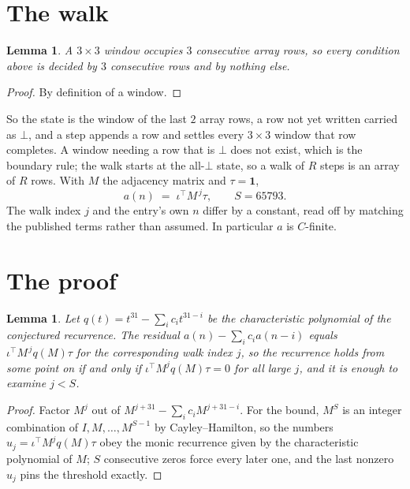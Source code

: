\documentclass[11pt,a4paper]{article}
\theoremstyle{plain}
\newtheorem{lemma}[theorem]{Lemma}
\theoremstyle{definition}
\begin{document}
\section{The walk}

\begin{lemma}\label{lem:win}
A $3\times3$ window occupies $3$ consecutive array rows, so every condition above is
decided by $3$ consecutive rows and by nothing else.
\end{lemma}

\begin{proof}
By definition of a window.
\end{proof}

So the state is the window of the last $2$ array rows, a row not yet written carried as
$\bot$, and a step appends a row and settles every $3\times3$ window that row completes. A
window needing a row that is $\bot$ does not exist, which is the boundary rule; the walk starts
at the all-$\bot$ state, so a walk of $R$ steps is an array of $R$ rows. With $M$ the adjacency
matrix and $\tau=\mathbf{1}$,
\[
a(n)\;=\;\iota^{\!\top}M^{\,j}\tau ,\qquad S=65793.
\]
The walk index $j$ and the entry's own $n$ differ by a constant, read off by matching the
published terms rather than assumed. In particular $a$ is $C$-finite.

\section{The proof}

\begin{lemma}\label{lem:crit}
Let $q(t)=t^{31}-\sum_i c_it^{31-i}$ be the characteristic polynomial of the
conjectured recurrence. The residual $a(n)-\sum_ic_ia(n-i)$ equals
$\iota^{\!\top}M^{\,j}q(M)\tau$ for the corresponding walk index $j$, so the recurrence
holds from some point on if and only if $\iota^{\!\top}M^{j}q(M)\tau=0$ for all large $j$,
and it is enough to examine $j<S$.
\end{lemma}

\begin{proof}
Factor $M^{j}$ out of $M^{j+31}-\sum_ic_iM^{j+31-i}$. For the bound, $M^{S}$
is an integer combination of $I,M,\dots,M^{S-1}$ by Cayley--Hamilton, so the numbers
$u_j=\iota^{\!\top}M^{j}q(M)\tau$ obey the monic recurrence given by the characteristic
polynomial of $M$; $S$ consecutive zeros force every later one, and the last nonzero $u_j$
pins the threshold exactly.
\end{proof}
\end{document}
